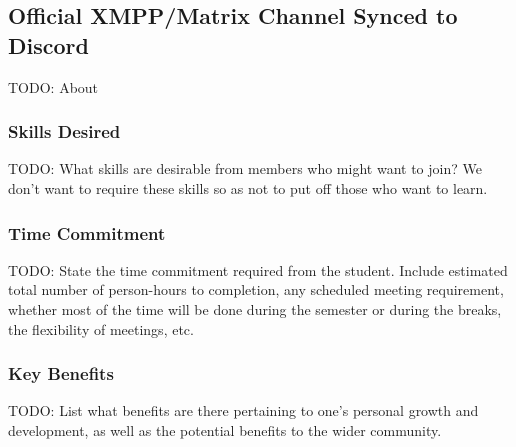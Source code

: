 \subsection{Official XMPP/Matrix Channel Synced to Discord}

TODO: About

\subsubsection*{Skills Desired}

TODO: What skills are desirable from members who might want to join?  We don't want to require these skills so as not to put off those who want to learn.

\subsubsection*{Time Commitment}

TODO: State the time commitment required from the student.  Include estimated total number of person-hours to completion, any scheduled meeting requirement, whether most of the time will be done during the semester or during the breaks, the flexibility of meetings, etc.

\subsubsection*{Key Benefits}

TODO: List what benefits are there pertaining to one's personal growth and development, as well as the potential benefits to the wider community.
